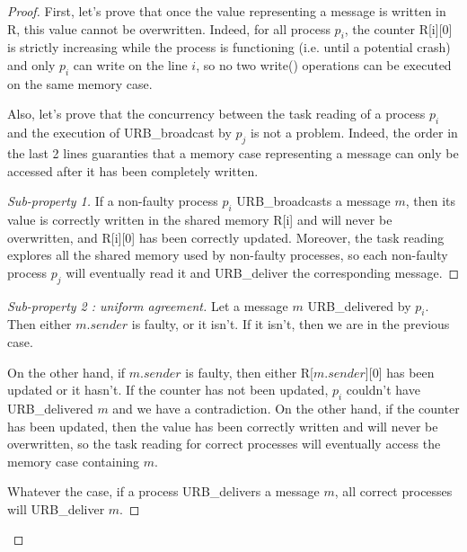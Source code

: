 \documentclass{scrartcl}
\begin{document}
\begin{proof}
First, let's prove that once the value representing a message is written in R, this value cannot be overwritten. Indeed, for all process $p_i$, the counter R[i][0] is strictly increasing while the process is functioning (i.e. until a potential crash) and only $p_i$ can write on the line $i$, so no two write() operations can be executed on the same memory case.

Also, let's prove that the concurrency between the task reading of a process $p_i$ and the execution of URB\_broadcast by $p_j$ is not a problem. Indeed, the order in the last 2 lines guaranties that a memory case representing a message can only be accessed after it has been completely written.
\renewcommand{\qedsymbol}{}
\begin{proof}[Sub-property 1]
If a non-faulty process $p_i$ URB\_broadcasts a message $m$, then its value is correctly written in the shared memory R[i] and will never be overwritten, and R[i][0] has been correctly updated. Moreover,  the task reading explores all the shared memory used by non-faulty processes, so each non-faulty process $p_j$ will eventually read it and URB\_deliver the corresponding message.
\end{proof}
\begin{proof}[Sub-property 2 : uniform agreement]
Let a message $m$ URB\_delivered by $p_i$. Then either $m.sender$ is faulty, or it isn't. If it isn't, then we are in the previous case.

On the other hand, if $m.sender$ is faulty, then either R[$m.sender$][0] has been updated or it hasn't. If the counter has not been updated, $p_i$ couldn't have URB\_delivered $m$ and we have a contradiction. On the other hand, if the counter has been updated, then the value has been correctly written and will never be overwritten, so the task reading for correct processes will eventually access the memory case containing $m$.

Whatever the case, if a process URB\_delivers a message $m$, all correct processes will URB\_deliver $m$.
\end{proof}
\end{proof}
\end{document}
